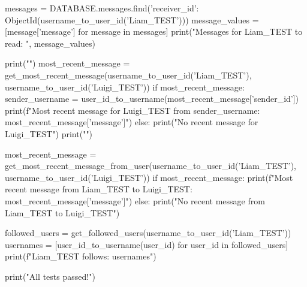 \documentclass[12pt]{article} %
\begin{document}
\begin{pythoncode}[caption={Messaging Functions for MongoDB}]
        messages = DATABASE.messages.find({'receiver_id': ObjectId(username_to_user_id('Liam_TEST'))})
        message_values = [message['message'] for message in messages]
        print("Messages for Liam_TEST to read: ", message_values)
    
        print("\n")
        most_recent_message = get_most_recent_message(username_to_user_id('Liam_TEST'), username_to_user_id('Luigi_TEST'))
        if most_recent_message:
            sender_username = user_id_to_username(most_recent_message['sender_id'])
            print(f"Most recent message for Luigi_TEST from {sender_username}: {most_recent_message['message']}")
        else:
            print("No recent message for Luigi_TEST")
        print("\n")
    
        most_recent_message = get_most_recent_message_from_user(username_to_user_id('Liam_TEST'), username_to_user_id('Luigi_TEST'))
        if most_recent_message:
            print(f"Most recent message from Liam_TEST to Luigi_TEST: {most_recent_message['message']}")
        else:
            print("No recent message from Liam_TEST to Luigi_TEST")
    
        followed_users = get_followed_users(username_to_user_id('Liam_TEST'))
        usernames = [user_id_to_username(user_id) for user_id in followed_users]
        print(f"Liam_TEST follows: {usernames}")
    
        print("All tests passed!")
\end{pythoncode}
\end{document}
